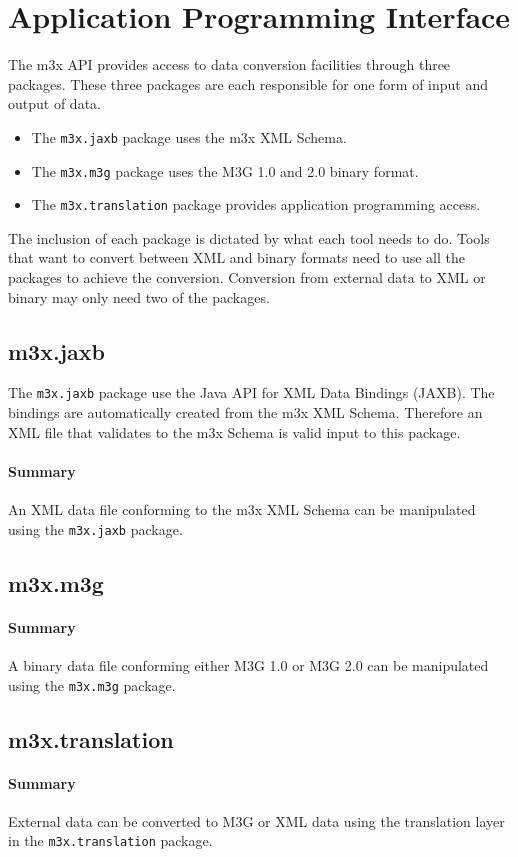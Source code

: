\chapter{Application Programming Interface}
The m3x API provides access to data conversion facilities through three packages.
These three packages are each responsible for one form of input and output of data.
\begin{itemize}
\item{The \texttt{m3x.jaxb} package uses the m3x XML Schema.}
\item{The \texttt{m3x.m3g} package uses the M3G 1.0 and 2.0 binary format.}
\item{The \texttt{m3x.translation} package provides application programming access.}
\end{itemize}

The inclusion of each package is dictated by what each tool needs to do. Tools that want to convert between XML and binary formats need to use all the packages to achieve the conversion. Conversion from external data to XML or binary may only need two of the packages.


\section{m3x.jaxb}
The \texttt{m3x.jaxb} package use the Java API for XML Data Bindings (JAXB). The bindings are automatically created from the m3x XML Schema. Therefore an XML file that validates to the m3x Schema is valid input to this package.

\subsubsection{Summary}
An XML data file conforming to the m3x XML Schema can be manipulated using the \texttt{m3x.jaxb} package.

\section{m3x.m3g}

\subsubsection{Summary}
A binary data file conforming either M3G 1.0 or M3G 2.0 can be manipulated using the \texttt{m3x.m3g} package.

\section{m3x.translation}

\subsubsection{Summary}
External data can be converted to M3G or XML data using the translation layer in the \texttt{m3x.translation} package.


